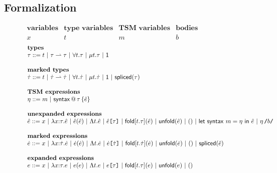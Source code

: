\subsection{Formalization}\label{sec:tsm-formalism}
\begin{figure}$\begin{array}{llllll}
\textbf{variables} & \textbf{type variables} & \textbf{TSM variables} & \textbf{bodies}\\
x & t & m & b\\~\end{array}$\\
$\begin{array}{l}
\textbf{types}\\
\tau ::= t ~\vert~ \tau \rightharpoonup \tau ~\vert~ \forall t.\tau ~\vert~ \mu t.\tau ~\vert~ \mathsf{1}\\
~\\
\textbf{marked types}\\
\dot{\tau} ::= t ~\vert~ \dot{\tau} \rightharpoonup \dot{\tau} ~\vert~ \forall t.\dot{\tau} ~\vert~ \mu t.\dot{\tau} ~\vert~ \mathsf{1} ~\vert~ \mathsf{spliced}(\tau)\\
~\\
\textbf{TSM expressions}\\
\eta ::= m ~\vert~ \mathsf{syntax} \,@\, \tau\,\{\hat{e}\}
\\~\\
\textbf{unexpanded expressions}\\
\hat{e} ::= {x} ~\vert~ \lambda x{:}\tau.\hat{e} ~\vert~ \hat{e}(\hat{e}) ~\vert~ \Lambda t.\hat{e} ~\vert~ \hat{e}\texttt{[}\tau\texttt{]} ~\vert~ \mathsf{fold}[t.\tau](\hat{e}) ~\vert~ \mathsf{unfold}(\hat{e}) ~\vert~ () ~\vert~ \mathsf{let~syntax}~m = \eta ~\mathsf{in}~\hat{e} ~\vert~ \eta\,\texttt{/}b\texttt{/}
\\~\\
\textbf{marked expressions}\\
\dot{e} ::= x ~\vert~ \lambda x{:}{\dot{\tau}}.\dot{e} ~\vert~ \dot{e}(\dot{e}) ~\vert~ \Lambda t.\dot{e} ~|~ \dot{e}\texttt{[}\dot{\tau}\texttt{]} ~\vert~ \mathsf{fold}[t.\dot\tau](\dot{e}) ~\vert~ \mathsf{unfold}(\dot{e}) ~\vert~ () ~\vert~ \mathsf{spliced}(\hat{e})
\\~\\
\textbf{expanded expressions}\\
e ::= x ~\vert~ \lambda x{:}{\tau}.e ~\vert~ e(e) ~\vert~ \Lambda t.e ~\vert~ e\texttt{[}\tau\texttt{]} ~\vert~ \mathsf{fold}[t.\tau](e) ~\vert~ \mathsf{unfold}(e) ~\vert~ ()\end{array}\\\vspace{8px}$

\end{figure}
